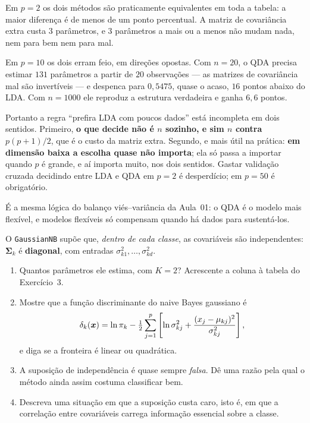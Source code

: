 \documentclass[11pt,a4paper]{article}
\begin{document}
\begin{solucao}
Em $p=2$ os dois métodos são praticamente equivalentes em toda a tabela: a maior
diferença é de menos de um ponto percentual. A matriz de covariância extra custa
$3$ parâmetros, e $3$ parâmetros a mais ou a menos não mudam nada, nem para bem
nem para mal.

Em $p=10$ os dois erram feio, em direções opostas. Com $n=20$, o QDA precisa
estimar $131$ parâmetros a partir de $20$ observações --- as matrizes de
covariância mal são invertíveis --- e despenca para $0{,}5475$, quase o acaso,
$16$ pontos abaixo do LDA. Com $n=1000$ ele reproduz a estrutura verdadeira e
ganha $6{,}6$ pontos.

Portanto a regra ``prefira LDA com poucos dados'' está incompleta em dois
sentidos. Primeiro, \textbf{o que decide não é $n$ sozinho, e sim $n$ contra
$p(p+1)/2$}, que é o custo da matriz extra. Segundo, e mais útil na prática:
\textbf{em dimensão baixa a escolha quase não importa}; ela só passa a importar
quando $p$ é grande, e aí importa muito, nos dois sentidos. Gastar validação
cruzada decidindo entre LDA e QDA em $p=2$ é desperdício; em $p=50$ é obrigatório.

É a mesma lógica do balanço viés--variância da Aula~01: o QDA é o modelo mais
flexível, e modelos flexíveis só compensam quando há dados para sustentá-los.
\end{solucao}

\begin{exercicio}
O \texttt{GaussianNB} supõe que, \emph{dentro de cada classe}, as covariáveis são
independentes: $\bm\Sigma_k$ é \textbf{diagonal}, com entradas
$\sigma_{k1}^2,\dots,\sigma_{kd}^2$.
\begin{enumerate}[label=(\alph*),leftmargin=1.1cm]
  \item Quantos parâmetros ele estima, com $K=2$? Acrescente a coluna à tabela
        do Exercício~3.
  \item Mostre que a função discriminante do naive Bayes gaussiano é
        \[
          \delta_k(\bm{x}) = \ln\pi_k
            - \tfrac12\sum_{j=1}^{p}\left[\ln\sigma_{kj}^2
              + \frac{(x_j-\mu_{kj})^2}{\sigma_{kj}^2}\right],
        \]
        e diga se a fronteira é linear ou quadrática.
  \item A suposição de independência é quase sempre \emph{falsa}. Dê uma razão
        pela qual o método ainda assim costuma classificar bem.
  \item Descreva uma situação em que a suposição custa caro, isto é, em que a
        correlação entre covariáveis carrega informação essencial sobre a classe.
\end{enumerate}
\end{exercicio}
\end{document}
